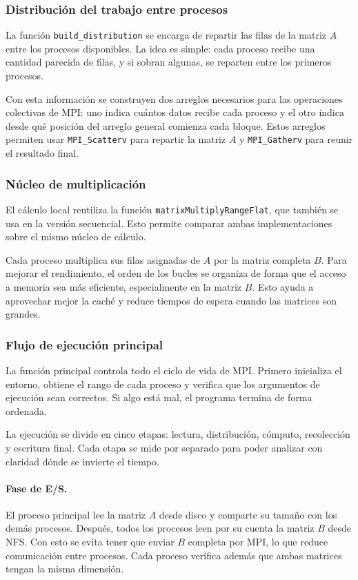 \subsubsection{Distribución del trabajo entre procesos}

La función \texttt{build\_distribution} se encarga de repartir las filas de la matriz \(A\) entre los procesos disponibles. La idea es simple: cada proceso recibe una cantidad parecida de filas, y si sobran algunas, se reparten entre los primeros procesos.

Con esta información se construyen dos arreglos necesarios para las operaciones colectivas de MPI: uno indica cuántos datos recibe cada proceso y el otro indica desde qué posición del arreglo general comienza cada bloque. Estos arreglos permiten usar \texttt{MPI\_Scatterv} para repartir la matriz \(A\) y \texttt{MPI\_Gatherv} para reunir el resultado final.

\subsubsection{Núcleo de multiplicación}

El cálculo local reutiliza la función \texttt{matrixMultiplyRangeFlat}, que también se usa en la versión secuencial. Esto permite comparar ambas implementaciones sobre el mismo núcleo de cálculo.

Cada proceso multiplica sus filas asignadas de \(A\) por la matriz completa \(B\). Para mejorar el rendimiento, el orden de los bucles se organiza de forma que el acceso a memoria sea más eficiente, especialmente en la matriz \(B\). Esto ayuda a aprovechar mejor la caché y reduce tiempos de espera cuando las matrices son grandes.

\subsubsection{Flujo de ejecución principal}

La función principal controla todo el ciclo de vida de MPI. Primero inicializa el entorno, obtiene el rango de cada proceso y verifica que los argumentos de ejecución sean correctos. Si algo está mal, el programa termina de forma ordenada.

La ejecución se divide en cinco etapas: lectura, distribución, cómputo, recolección y escritura final. Cada etapa se mide por separado para poder analizar con claridad dónde se invierte el tiempo.

\paragraph{Fase de E/S.}  
El proceso principal lee la matriz \(A\) desde disco y comparte su tamaño con los demás procesos. Después, todos los procesos leen por su cuenta la matriz \(B\) desde NFS. Con esto se evita tener que enviar \(B\) completa por MPI, lo que reduce comunicación entre procesos. Cada proceso verifica además que ambas matrices tengan la misma dimensión.

